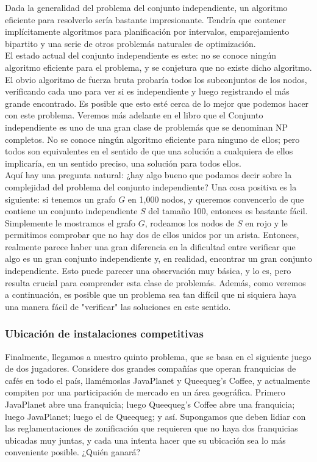 \documentclass[a4paper]{article}
\begin{document}
Dada la generalidad del problema del conjunto independiente, un algoritmo eficiente para resolverlo sería bastante impresionante. Tendría que contener implícitamente algoritmos para planificación por intervalos, emparejamiento bipartito y una serie de otros problemás naturales de optimización.\\

El estado actual del conjunto independiente es este: no se conoce ningún algoritmo eficiente para el problema, y se conjetura que no existe dicho algoritmo. El obvio algoritmo de fuerza bruta probaría todos los subconjuntos de los nodos, verificando cada uno para ver si es independiente y luego registrando el más grande encontrado. Es posible que esto esté cerca de lo mejor que podemos hacer con este problema. Veremos más adelante en el libro que el Conjunto independiente es uno de una gran clase de problemás que se denominan NP completos. No se conoce ningún algoritmo eficiente para ninguno de ellos; pero todos son equivalentes en el sentido de que una solución a cualquiera de ellos implicaría, en un sentido preciso, una solución para todos ellos.\\

Aquí hay una pregunta natural: ¿hay algo bueno que podamos decir sobre la complejidad del problema del conjunto independiente? Una cosa positiva es la siguiente: si tenemos un grafo $G$ en 1,000 nodos, y queremos convencerlo de que contiene un conjunto independiente $S$ del tamaño 100, entonces es bastante fácil. Simplemente le mostramos el grafo $G$, rodeamos los nodos de $S$ en rojo y le permitimos comprobar que no hay dos de ellos unidos por un arista. Entonces, realmente parece haber una gran diferencia en la dificultad entre verificar que algo es un gran conjunto independiente y, en realidad, encontrar un gran conjunto independiente. Esto puede parecer una observación muy básica, y lo es, pero resulta crucial para comprender esta clase de problemás. Además, como veremos a continuación, es posible que un problema sea tan difícil que ni siquiera haya una manera fácil de "verificar" las soluciones en este sentido.\\

\subsubsection*{Ubicación de instalaciones competitivas}

Finalmente, llegamos a nuestro quinto problema, que se basa en el siguiente juego de dos jugadores. Considere dos grandes compañías que operan franquicias de cafés en todo el país, llamémoslas JavaPlanet y Queequeg's Coffee, y actualmente compiten por una participación de mercado en un área geográfica. Primero JavaPlanet abre una franquicia; luego Queequeg's Coffee abre una franquicia; luego JavaPlanet; luego el de Queequeg; y así. Supongamos que deben lidiar con las reglamentaciones de zonificación que requieren que no haya dos franquicias ubicadas muy juntas, y cada una intenta hacer que su ubicación sea lo más conveniente posible. ¿Quién ganará?\\
\end{document}
